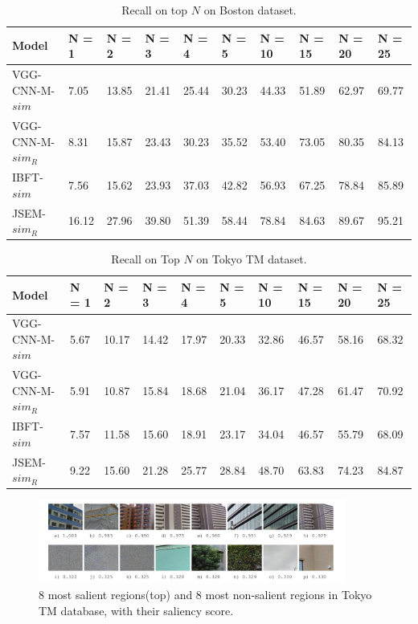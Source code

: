 \begin{table}[h]
\begin{tabular}{l|l|l|l|l|l|l|l|l|l}
\textbf{Model} & \textbf{N = 1} & \textbf{N = 2}& \textbf{N = 3}& \textbf{N = 4}& \textbf{N = 5}& \textbf{N = 10}& \textbf{N = 15} & \textbf{N = 20} & \textbf{N = 25} \\
\hline
VGG-CNN-M-$sim$ &7.05 & 13.85 & 21.41 & 25.44 & 30.23 & 44.33 & 51.89 & 62.97 & 69.77 \\
VGG-CNN-M-$sim_R$ & 8.31 & 15.87 & 23.43 & 30.23 & 35.52 & 53.40 & 73.05 & 80.35 & 84.13 \\
IBFT-$sim$ & 7.56 & 15.62 & 23.93 & 37.03 & 42.82 & 56.93 & 67.25 & 78.84 & 85.89 \\
JSEM-$sim_R$ & 16.12 & 27.96 & 39.80 & 51.39 & 58.44 & 78.84 & 84.63 & 89.67 & 95.21
\end{tabular}
\caption{Recall on top $N$ on Boston dataset.}
\label{table:boston_recall}
\end{table} 


\begin{table}[h]
\begin{tabular}{l|l|l|l|l|l|l|l|l|l}
\textbf{Model} & \textbf{N = 1} & \textbf{N = 2}& \textbf{N = 3}& \textbf{N = 4}& \textbf{N = 5}& \textbf{N = 10}& \textbf{N = 15} & \textbf{N = 20} & \textbf{N = 25} \\
\hline
VGG-CNN-M-$sim$ & 5.67&10.17& 14.42& 17.97& 20.33& 32.86& 46.57& 58.16& 68.32 \\
VGG-CNN-M-$sim_R$ & 5.91& 10.87& 15.84& 18.68& 21.04& 36.17& 47.28& 61.47& 70.92 \\
IBFT-$sim$ & 7.57& 11.58& 15.60& 18.91& 23.17& 34.04& 46.57& 55.79& 68.09 \\
JSEM-$sim_R$ & 9.22 & 15.60 & 21.28 & 25.77& 28.84&48.70&63.83&74.23&84.87 
\end{tabular}
\caption{Recall on Top $N$ on Tokyo TM dataset.}
\label{table:netvlad-result}
\end{table} 

\begin{figure}[h]
\includegraphics[width=0.9\textwidth]{img/salient}
\caption{8 most salient regions(top) and 8 most non-salient regions in Tokyo TM database, with their saliency score.}
\label{fig:saliency}
\end{figure}

